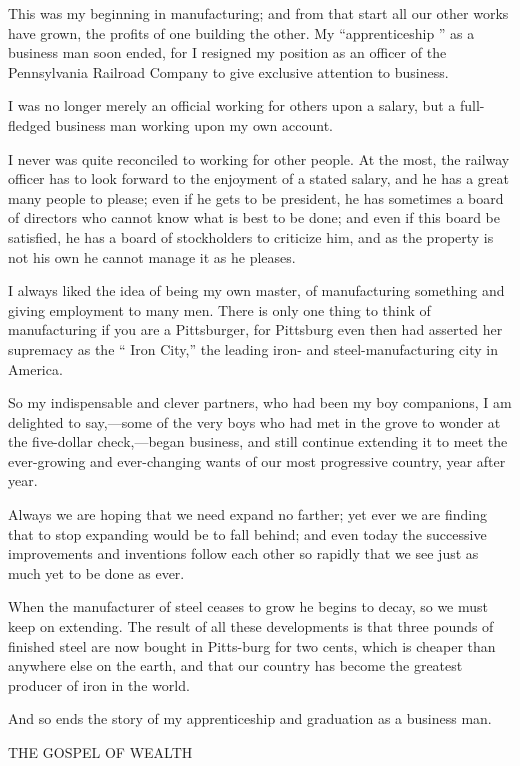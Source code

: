 \documentclass[11pt,openany]{book}
\begin{document}
This was my beginning in manufacturing; and from that start all our other works have grown, the profits of one building the other. My ``apprenticeship '' as a business man soon ended, for I resigned my position as an officer of the Pennsylvania Railroad Company to give exclusive attention to business.

I was no longer merely an official working for others upon a salary, but a full-fledged business man working upon my own account.

I never was quite reconciled to working for other people. At the most, the railway officer has to look forward to the enjoyment of a stated salary, and he has a great many people to please; even if he gets to be president, he has sometimes a board of directors who cannot know what is best to be done; and even if this board be satisfied, he has a board of stockholders to criticize him, and as the property is not his own he cannot manage it as he pleases.

I always liked the idea of being my own master, of manufacturing something and giving employment to many men. There is only one thing to think of manufacturing if you are a Pittsburger, for Pittsburg even then had asserted her supremacy as the `` Iron City,'' the leading iron- and steel-manufacturing city in America.

So my indispensable and clever partners, who had been my boy companions, I am delighted to say,---some of the very boys who had met in the grove to wonder at the five-dollar check,---began business, and still continue extending it to meet the ever-growing and ever-changing wants of our most progressive country, year after year.

Always we are hoping that we need expand no farther; yet ever we are finding that to stop expanding would be to fall behind; and even today the successive improvements and inventions follow each other so rapidly that we see just as much yet to be done as ever.

When the manufacturer of steel ceases to grow he begins to decay, so we must keep on extending. The result of all these developments is that three pounds of finished steel are now bought in Pitts-burg for two cents, which is cheaper than anywhere else on the earth, and that our country has become the greatest producer of iron in the world.

And so ends the story of my apprenticeship and graduation as a business man.

THE GOSPEL OF WEALTH
\end{document}
